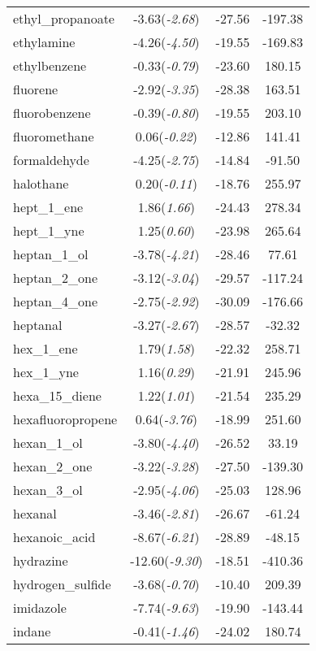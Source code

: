 \documentclass{amsart}
\begin{document}
\begin{center}
\begin{longtable}{l|c|c|c}
ethyl\_propanoate & -3.63(\textit{-2.68}) & -27.56 & -197.38 \\ 
ethylamine & -4.26(\textit{-4.50}) & -19.55 & -169.83 \\ 
ethylbenzene & -0.33(\textit{-0.79}) & -23.60 & 180.15 \\ 
fluorene & -2.92(\textit{-3.35}) & -28.38 & 163.51 \\ 
fluorobenzene & -0.39(\textit{-0.80}) & -19.55 & 203.10 \\ 
fluoromethane & 0.06(\textit{-0.22}) & -12.86 & 141.41 \\ 
formaldehyde & -4.25(\textit{-2.75}) & -14.84 & -91.50 \\ 
halothane & 0.20(\textit{-0.11}) & -18.76 & 255.97 \\ 
hept\_1\_ene & 1.86(\textit{1.66}) & -24.43 & 278.34 \\ 
hept\_1\_yne & 1.25(\textit{0.60}) & -23.98 & 265.64 \\ 
heptan\_1\_ol & -3.78(\textit{-4.21}) & -28.46 & 77.61 \\ 
heptan\_2\_one & -3.12(\textit{-3.04}) & -29.57 & -117.24 \\ 
heptan\_4\_one & -2.75(\textit{-2.92}) & -30.09 & -176.66 \\ 
heptanal & -3.27(\textit{-2.67}) & -28.57 & -32.32 \\ 
hex\_1\_ene & 1.79(\textit{1.58}) & -22.32 & 258.71 \\ 
hex\_1\_yne & 1.16(\textit{0.29}) & -21.91 & 245.96 \\ 
hexa\_15\_diene & 1.22(\textit{1.01}) & -21.54 & 235.29 \\ 
hexafluoropropene & 0.64(\textit{-3.76}) & -18.99 & 251.60 \\ 
hexan\_1\_ol & -3.80(\textit{-4.40}) & -26.52 & 33.19 \\ 
hexan\_2\_one & -3.22(\textit{-3.28}) & -27.50 & -139.30 \\ 
hexan\_3\_ol & -2.95(\textit{-4.06}) & -25.03 & 128.96 \\ 
hexanal & -3.46(\textit{-2.81}) & -26.67 & -61.24 \\ 
hexanoic\_acid & -8.67(\textit{-6.21}) & -28.89 & -48.15 \\ 
hydrazine & -12.60(\textit{-9.30}) & -18.51 & -410.36 \\ 
hydrogen\_sulfide & -3.68(\textit{-0.70}) & -10.40 & 209.39 \\ 
imidazole & -7.74(\textit{-9.63}) & -19.90 & -143.44 \\ 
indane & -0.41(\textit{-1.46}) & -24.02 & 180.74 \\ 

\end{longtable}
\end{center}
\end{document}
